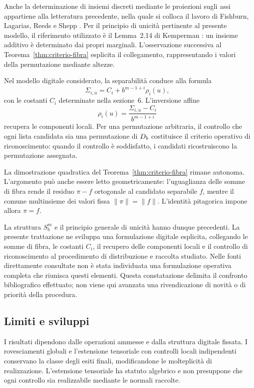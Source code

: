 	Anche la determinazione di insiemi discreti mediante le proiezioni sugli
	assi appartiene alla letteratura precedente, nella quale si colloca il
	lavoro di Fishburn, Lagarias, Reeds e Shepp \cite{fishburn-et-al}.
	Per il principio di unicità pertinente al presente modello, il riferimento
	utilizzato è il Lemma~2.14 di Kemperman \cite[p.~282]{kemperman}:
	un insieme additivo è determinato dai propri marginali. L'osservazione
	successiva al Teorema~\ref{thm:criterio-fibra} esplicita il collegamento,
	rappresentando i valori della permutazione mediante altezze.

	Nel modello digitale considerato, la separabilità conduce alla formula
	\[
	\Sigma_{i,u}
	=
	C_i+b^{m-1+i}\rho_i(u),
	\]
	con le costanti \(C_i\) determinate nella sezione~6. L'inversione affine
	\[
	\rho_i(u)
	=
	\frac{\Sigma_{i,u}-C_i}{b^{m-1+i}}
	\]
	recupera le componenti locali. Per una permutazione arbitraria, il
	controllo che ogni lista candidata sia una permutazione di \(D_b\)
	costituisce il criterio operativo di riconoscimento: quando il controllo
	è soddisfatto, i candidati ricostruiscono la permutazione assegnata.

	La dimostrazione quadratica del Teorema~\ref{thm:criterio-fibra} rimane
	autonoma. L'argomento può anche essere letto geometricamente:
	l'uguaglianza delle somme di fibra rende il residuo \(\pi-f\) ortogonale
	al candidato separabile \(f\), mentre il comune multinsieme dei valori
	fissa \(\|\pi\|=\|f\|\). L'identità pitagorica impone allora \(\pi=f\).

	La struttura \(S_b^m\) e il principio generale di unicità hanno dunque
	precedenti. La presente trattazione ne sviluppa una formulazione digitale
	esplicita, collegando le somme di fibra, le costanti \(C_i\), il recupero
	delle componenti locali e il controllo di riconoscimento al procedimento
	di distribuzione e raccolta studiato. Nelle fonti direttamente consultate
	non è stata individuata una formulazione operativa completa che riunisca
	questi elementi. Questa constatazione delimita il confronto bibliografico
	effettuato; non viene qui avanzata una rivendicazione di novità o di
	priorità della procedura.

	\subsection{Limiti e sviluppi}

	I risultati dipendono dalle operazioni ammesse e dalla struttura digitale
	fissata. I rovesciamenti globali e l'estensione tensoriale con controlli
	locali indipendenti conservano la classe degli esiti finali,
	modificandone le molteplicità di realizzazione. L'estensione tensoriale
	ha statuto algebrico e non presuppone che ogni controllo sia realizzabile
	mediante le normali raccolte.

